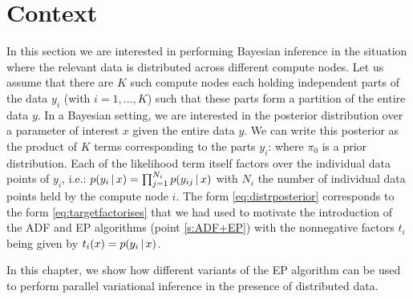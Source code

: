 

\section{Context}

In this section we are interested in performing Bayesian inference in the situation where the relevant data is distributed across different compute nodes. 
Let us assume that there are $K$ such compute nodes each holding independent parts of the data $y_i$ (with $i=1,\dots,K$) such that these parts form a partition of the entire data $y$. 
In a Bayesian setting, we are interested in the posterior distribution over a parameter of interest $x$ given the entire data $y$. We can write this posterior as the product of $K$ terms corresponding to the parts $y_i$:
%
%
where $\pi_0$ is a prior distribution. Each of the likelihood term itself factors over the individual data points of $y_i$, i.e.: $p(y_i\,|\, x)=\prod_{j=1}^{N_i}p(y_{ij}\,|\, x)$ with $N_i$ the number of individual data points held by the compute node $i$.
The form \eqref{eq:distrposterior} corresponds to the form \eqref{eq:targetfactorises} that we had used to motivate the introduction of the ADF and EP algorithms (point \ref{s:ADF+EP}) with the nonnegative factors $t_i$ being given by $t_i(x)=p(y_i\,|\, x)$.

In this chapter, we show how different variants of the EP algorithm can be used to perform parallel variational inference in the presence of distributed data.

